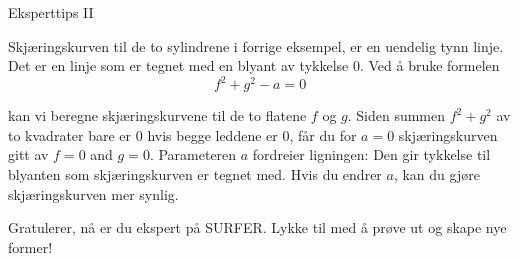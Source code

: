 \documentclass[no]{./../../common/SurferDesc}%
\begin{document}
\footnotesize
%

 
 \begin{surferPage}
  \begin{surferTitle}Eksperttips II\end{surferTitle}
   \begin{surferText}

Skjæringskurven til de to sylindrene i forrige eksempel, er en uendelig tynn linje. Det er en linje som er tegnet med en blyant av tykkelse 0. Ved å bruke formelen 
\[ f^2+g^2-a=0\]

kan vi beregne skjæringskurvene til de to flatene $f$ og $g$. Siden summen $f^2+g^2$ av to kvadrater bare er 
$0$ hvis begge leddene er $0$, får du for $a=0$ skjæringskurven gitt av $f=0$ and $g=0$. 
Parameteren $a$ fordreier ligningen: Den gir tykkelse til blyanten som skjæringskurven er 
tegnet med. Hvis du endrer $a$, kan du gjøre skjæringskurven mer synlig.  \newline \newline

Gratulerer, nå er du ekspert på SURFER. Lykke til med å prøve ut og skape nye former! 


     \end{surferText}
\end{surferPage}

\end{document}
